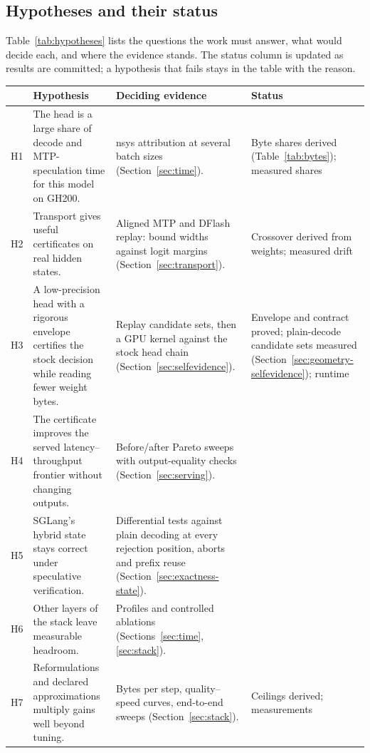 \subsection{Hypotheses and their status}\label{sec:hypotheses}
Table~\ref{tab:hypotheses} lists the questions the work must answer, what would decide each, and where the evidence stands. The status column is updated as results are committed; a hypothesis that fails stays in the table with the reason.

\begin{table}[tbp]
\small\centering
\begin{tabularx}{\linewidth}{@{}P{.6cm}YP{3.7cm}P{3.1cm}@{}}\toprule
& Hypothesis & Deciding evidence & Status\\\midrule
H1 & The head is a large share of decode and MTP-speculation time for this model on GH200. & nsys attribution at several batch sizes (Section~\ref{sec:time}). & Byte shares derived (Table~\ref{tab:bytes}); measured shares \\
H2 & Transport gives useful certificates on real hidden states. & Aligned MTP and DFlash replay: bound widths against logit margins (Section~\ref{sec:transport}). & Crossover derived from weights; measured drift \\
H3 & A low-precision head with a rigorous envelope certifies the stock decision while reading fewer weight bytes. & Replay candidate sets, then a GPU kernel against the stock head chain (Section~\ref{sec:selfevidence}). & Envelope and contract proved; plain-decode candidate sets measured (Section~\ref{sec:geometry-selfevidence}); runtime \\
H4 & The certificate improves the served latency--throughput frontier without changing outputs. & Before/after Pareto sweeps with output-equality checks (Section~\ref{sec:serving}). & \\
H5 & SGLang's hybrid state stays correct under speculative verification. & Differential tests against plain decoding at every rejection position, aborts and prefix reuse (Section~\ref{sec:exactness-state}). & \\
H6 & Other layers of the stack leave measurable headroom. & Profiles and controlled ablations (Sections~\ref{sec:time}, \ref{sec:stack}). & \\
H7 & Reformulations and declared approximations multiply gains well beyond tuning. & Bytes per step, quality--speed curves, end-to-end sweeps (Section~\ref{sec:stack}). & Ceilings derived; measurements \\

\end{tabularx}
\end{table}
